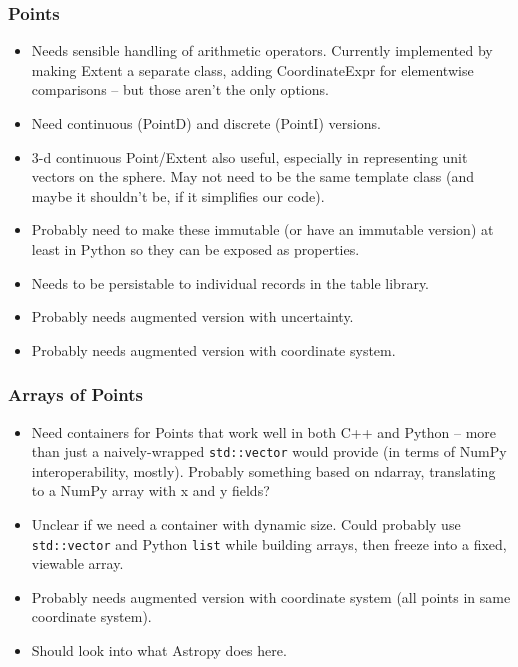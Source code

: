 \subsubsection{Points}
\label{sec:spCartesianPoints}

\begin{itemize}
\item Needs sensible handling of arithmetic operators.  Currently implemented by making Extent a separate class, adding CoordinateExpr for elementwise comparisons -- but those aren't the only options.
\item Need continuous (PointD) and discrete (PointI) versions.
\item 3-d continuous Point/Extent also useful, especially in representing unit vectors on the sphere.  May not need to be the same template class (and maybe it shouldn't be, if it simplifies our code).
\item Probably need to make these immutable (or have an immutable version) at least in Python so they can be exposed as properties.
\item Needs to be persistable to individual records in the table library.
\item Probably needs augmented version with uncertainty.
\item Probably needs augmented version with coordinate system.
\end{itemize}

\subsubsection{Arrays of Points}
\label{sec:spCartesianPointArrays}

\begin{itemize}
\item Need containers for Points that work well in both C++ and Python -- more than just a naively-wrapped \texttt{std::vector} would provide (in terms of NumPy interoperability, mostly).  Probably something based on ndarray, translating to a NumPy array with x and y fields?
\item Unclear if we need a container with dynamic size.  Could probably use \texttt{std::vector} and Python \texttt{list} while building arrays, then freeze into a fixed, viewable array.
\item Probably needs augmented version with coordinate system (all points in same coordinate system).
\item Should look into what Astropy does here.
\end{itemize}

